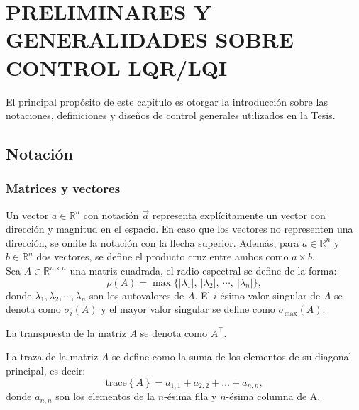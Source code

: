 \chapter{PRELIMINARES Y GENERALIDADES SOBRE CONTROL LQR/LQI}
\label{cap:Notación y preliminares}

El principal propósito de este capítulo es otorgar la introducción sobre las notaciones, definiciones y diseños de control generales utilizados en la Tesis.

\section{Notación} \label{sec:notación}

\subsection{Matrices y vectores} \label{sec:matrices}

Un vector $a\in\mathbb{R}^n$ con notación $\vec{a}$ representa explícitamente un vector con dirección y magnitud en el espacio. En caso que los vectores no representen una dirección, se omite la notación con la flecha superior. Además, para $a\in \mathbb{R}^n$ y $b\in \mathbb{R}^n$ dos vectores, se define el producto cruz entre ambos como $a \times b$. \\

Sea $A \in \mathbb{R}^{n\times n}$ una matriz cuadrada, el radio espectral se define de la forma:
\begin{equation*}
    \rho (A) = \max \{ |\lambda_1|,\ |\lambda_2|,\ \cdots ,\ |\lambda_n| \},
\end{equation*}
donde $\lambda_1, \lambda_2 , \cdots , \lambda_n$ son los autovalores de $A$. El $i$-ésimo valor singular de $A$ se denota como  $\sigma_i(A)$ y el mayor valor singular se define como $\sigma_{\max}(A)$. 

La transpuesta de la matriz $A$ se denota como $A^{\top}$. 

La traza de la matriz $A$ se define como la suma de los elementos de su diagonal principal, es decir:
\begin{equation*}
    \textrm{trace}\left\{ A \right\} = a_{1,1} + a_{2,2} + \hdots + a_{n,n},
\end{equation*}
donde $a_{n,n}$ son los elementos de la $n$-ésima fila y $n$-ésima columna de A. \\

